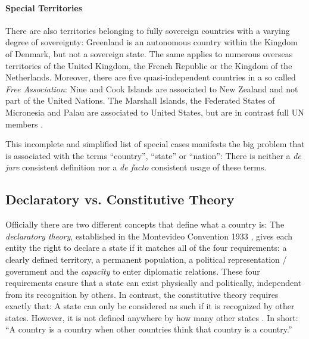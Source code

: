 \paragraph{Special Territories} %
\label{par:special_territories}

There are also territories belonging to fully sovereign countries with a varying degree of sovereignty: Greenland is an autonomous country within the Kingdom of Denmark, but not a sovereign state. The same applies to numerous overseas territories of the United Kingdom, the French Republic or the Kingdom of the Netherlands. Moreover, there are five quasi-independent countries in a so called \emph{Free Association}: Niue and Cook Islands are associated to New Zealand and not part of the United Nations. The Marshall Islands, the Federated States of Micronesia and Palau are associated to United States, but are in contrast full UN members \cite{SpecialTerritories}.


This incomplete and simplified list of special cases manifests the big problem that is associated with the terms ``country'', ``state'' or ``nation'': There is neither a \emph{de jure} consistent definition nor a \emph{de facto} consistent usage of these terms.


\subsection{Declaratory vs. Constitutive Theory} %
\label{sub:declaratory_vs_constitutive_theory}

Officially there are two different concepts that define what a country is: The \emph{declaratory theory}, established in the Montevideo Convention 1933 \cite{MontevideoConvention}, gives each entity the right to declare a state if it matches all of the four requirements: a clearly defined territory, a permanent population, a political representation / government and the \emph{capacity} to enter diplomatic relations. These four requirements ensure that a state can exist physically and politically, independent from its recognition by others.
In contrast, the constitutive theory requires exactly that: A state can only be considered as such if it is recognized by other states. However, it is not defined anywhere by how many other states \cite{StateTheory}. In short: ``A country is a country when other countries think that country is a country.'' \cite{greyCountries}

